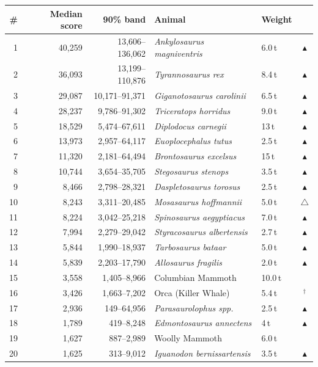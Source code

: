 \documentclass[11pt]{article}
\begin{document}
\small
\begin{longtable}{rrrllc}
\toprule
\# & Median score & 90\% band & Animal & Weight & \\
\midrule
\endhead
1 & 40,259 & 13,606--136,062 & \textit{Ankylosaurus magniventris} & 6.0\,t & $\blacktriangle$ \\
2 & 36,093 & 13,199--110,876 & \textit{Tyrannosaurus rex} & 8.4\,t & $\blacktriangle$ \\
3 & 29,087 & 10,171--91,371 & \textit{Giganotosaurus carolinii} & 6.5\,t & $\blacktriangle$ \\
4 & 28,237 & 9,786--91,302 & \textit{Triceratops horridus} & 9.0\,t & $\blacktriangle$ \\
5 & 18,529 & 5,474--67,611 & \textit{Diplodocus carnegii} & 13\,t & $\blacktriangle$ \\
6 & 13,973 & 2,957--64,117 & \textit{Euoplocephalus tutus} & 2.5\,t & $\blacktriangle$ \\
7 & 11,320 & 2,181--64,494 & \textit{Brontosaurus excelsus} & 15\,t & $\blacktriangle$ \\
8 & 10,744 & 3,654--35,705 & \textit{Stegosaurus stenops} & 3.5\,t & $\blacktriangle$ \\
9 & 8,466 & 2,798--28,321 & \textit{Daspletosaurus torosus} & 2.5\,t & $\blacktriangle$ \\
10 & 8,243 & 3,311--20,485 & \textit{Mosasaurus hoffmannii} & 5.0\,t & $\triangle$ \\
11 & 8,224 & 3,042--25,218 & \textit{Spinosaurus aegyptiacus} & 7.0\,t & $\blacktriangle$ \\
12 & 7,994 & 2,279--29,042 & \textit{Styracosaurus albertensis} & 2.7\,t & $\blacktriangle$ \\
13 & 5,844 & 1,990--18,937 & \textit{Tarbosaurus bataar} & 5.0\,t & $\blacktriangle$ \\
14 & 5,839 & 2,203--17,790 & \textit{Allosaurus fragilis} & 2.0\,t & $\blacktriangle$ \\
15 & 3,558 & 1,405--8,966 & Columbian Mammoth & 10.0\,t &  \\
16 & 3,426 & 1,663--7,202 & Orca (Killer Whale) & 5.4\,t & $^{\dagger}$ \\
17 & 2,936 & 149--64,956 & \textit{Parasaurolophus spp.} & 2.5\,t & $\blacktriangle$ \\
18 & 1,789 & 419--8,248 & \textit{Edmontosaurus annectens} & 4\,t & $\blacktriangle$ \\
19 & 1,627 & 887--2,989 & Woolly Mammoth & 6.0\,t &  \\
20 & 1,625 & 313--9,012 & \textit{Iguanodon bernissartensis} & 3.5\,t & $\blacktriangle$ \\

\end{longtable}
\end{document}
